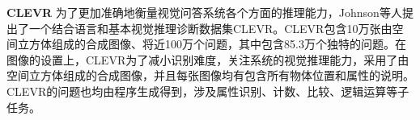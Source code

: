 \textbf{CLEVR}\qquad
为了更加准确地衡量视觉问答系统各个方面的推理能力，Johnson等人提出了一个结合语言和基本视觉推理诊断数据集CLEVR。CLEVR包含10万张由空间立方体组成的合成图像、将近100万个问题，其中包含85.3万个独特的问题。在图像的设置上，CLEVR为了减小识别难度，关注系统的视觉推理能力，采用了由空间立方体组成的合成图像，并且每张图像均有包含所有物体位置和属性的说明。CLEVR的问题也均由程序生成得到，涉及属性识别、计数、比较、逻辑运算等子任务。





